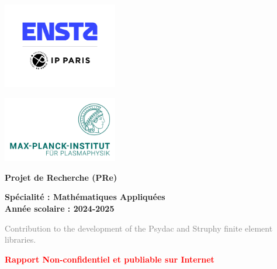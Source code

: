 \documentclass[a4paper,12pt,twoside]{report}
\author{Arasu Candassamy}
\begin{document}
\thispagestyle{empty}

\begin{minipage}{0.6\textwidth}
    \includegraphics[width=5cm]{logoENSTA.jpg} 
\end{minipage}
\hfill
\begin{minipage}{0.6\textwidth}
    \includegraphics[width=5cm]{logoMPI.png}
\end{minipage}

\vspace{2cm}

\begin{center}
    {\LARGE \textbf{Projet de Recherche (PRe)}}
    
    \vspace{0.5cm}
    \textbf{Spécialité : Mathématiques Appliquées} \\
    \textbf{Année scolaire : 2024-2025}
    
    \vspace{2cm}
    
    {\Huge \textcolor{gray}{Contribution to the development of the Psydac and Struphy finite element libraries.}} \\
    
    \vspace{1.5cm}
        
    \begin{framed}
        \centering
        \textcolor{red}{\textbf{Rapport Non-confidentiel et publiable sur Internet}} 
    \end{framed}
\end{center}
\end{document}
